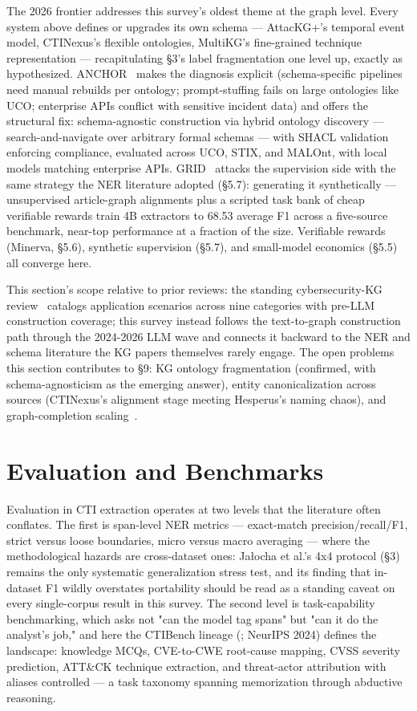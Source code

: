 \documentclass[11pt]{article}
\begin{document}
The 2026 frontier addresses this survey's oldest theme at the graph level. Every system above defines or upgrades its own schema — AttacKG+'s temporal event model, CTINexus's flexible ontologies, MultiKG's fine-grained technique representation — recapitulating §3's label fragmentation one level up, exactly as hypothesized. ANCHOR~\citep{kim2026schemaagnostic} makes the diagnosis explicit (schema-specific pipelines need manual rebuilds per ontology; prompt-stuffing fails on large ontologies like UCO; enterprise APIs conflict with sensitive incident data) and offers the structural fix: schema-agnostic construction via hybrid ontology discovery — search-and-navigate over arbitrary formal schemas — with SHACL validation enforcing compliance, evaluated across UCO, STIX, and MALOnt, with local models matching enterprise APIs. GRID~\citep{huang2026grid} attacks the supervision side with the same strategy the NER literature adopted (§5.7): generating it synthetically — unsupervised article-graph alignments plus a scripted task bank of cheap verifiable rewards train 4B extractors to 68.53 average F1 across a five-source benchmark, near-top performance at a fraction of the size. Verifiable rewards (Minerva, §5.6), synthetic supervision (§5.7), and small-model economics (§5.5) all converge here.

This section's scope relative to prior reviews: the standing cybersecurity-KG review~\citep{liu2022review} catalogs application scenarios across nine categories with pre-LLM construction coverage; this survey instead follows the text-to-graph construction path through the 2024-2026 LLM wave and connects it backward to the NER and schema literature the KG papers themselves rarely engage. The open problems this section contributes to §9: KG ontology fragmentation (confirmed, with schema-agnosticism as the emerging answer), entity canonicalization across sources (CTINexus's alignment stage meeting Hesperus's naming chaos), and graph-completion scaling~\citep{fieblinger2024actionable}.

\section{Evaluation and Benchmarks}

Evaluation in CTI extraction operates at two levels that the literature often conflates. The first is span-level NER metrics — exact-match precision/recall/F1, strict versus loose boundaries, micro versus macro averaging — where the methodological hazards are cross-dataset ones: Ja\l{}ocha et al.'s 4x4 protocol (§3) remains the only systematic generalization stress test, and its finding that in-dataset F1 wildly overstates portability should be read as a standing caveat on every single-corpus result in this survey. The second level is task-capability benchmarking, which asks not "can the model tag spans" but "can it do the analyst's job," and here the CTIBench lineage (\citealp{alam2024ctibench}; NeurIPS 2024) defines the landscape: knowledge MCQs, CVE-to-CWE root-cause mapping, CVSS severity prediction, ATT\&CK technique extraction, and threat-actor attribution with aliases controlled — a task taxonomy spanning memorization through abductive reasoning.
\end{document}
